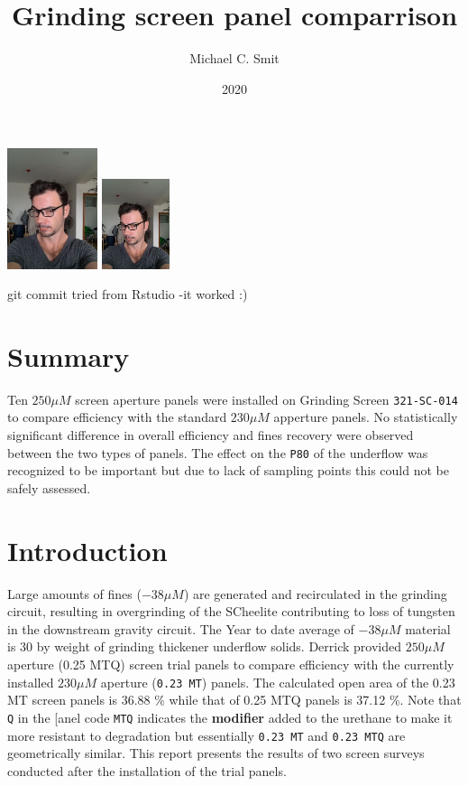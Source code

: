 \documentclass[
]{article}
\title{Grinding screen panel comparrison}
\author{Michael C. Smit}
\date{2020}
\begin{document}
\maketitle

\includegraphics[width=1.04167in,height=\textheight]{06_images/me-glasses.jpg}
\includegraphics[width=0.78125in,height=\textheight]{06_images/me-glasses.jpg}

git commit tried from Rstudio -it worked :)

\hypertarget{summary}{%
\section{Summary}\label{summary}}

Ten \(250 \mu M\) screen aperture panels were installed on Grinding
Screen \texttt{321-SC-014} to compare efficiency with the standard
\(230 \mu M\) apperture panels. No statistically significant difference
in overall efficiency and fines recovery were observed between the two
types of panels. The effect on the \texttt{P80} of the underflow was
recognized to be important but due to lack of sampling points this could
not be safely assessed.

\hypertarget{introduction}{%
\section{Introduction}\label{introduction}}

Large amounts of fines (\(-38 \mu M\)) are generated and recirculated in
the grinding circuit, resulting in overgrinding of the SCheelite
contributing to loss of tungsten in the downstream gravity circuit. The
Year to date average of \(-38 \mu M\) material is \(30 %
\) by weight of grinding thickener underflow solids. Derrick provided
\(250 \mu M\) aperture (0.25 MTQ) screen trial panels to compare
efficiency with the currently installed \(230 \mu M\) aperture
(\texttt{0.23\ MT}) panels. The calculated open area of the 0.23 MT
screen panels is 36.88 \% while that of 0.25 MTQ panels is 37.12 \%.
Note that \texttt{Q} in the {[}anel code \texttt{MTQ} indicates the
\textbf{modifier} added to the urethane to make it more resistant to
degradation but essentially \texttt{0.23\ MT} and \texttt{0.23\ MTQ} are
geometrically similar. This report presents the results of two screen
surveys conducted after the installation of the trial panels.
\end{document}
